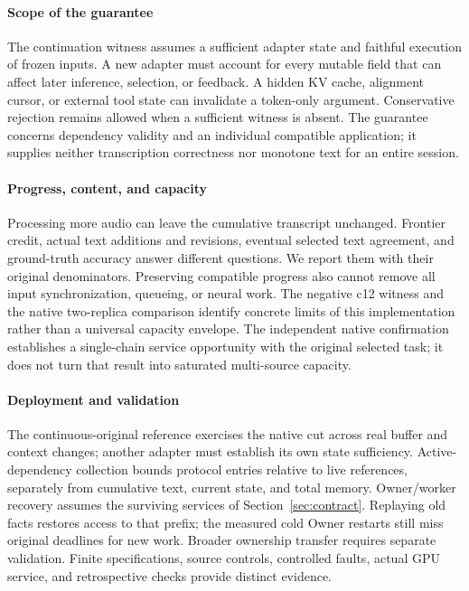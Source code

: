 \paragraph{Scope of the guarantee}
The continuation witness assumes a sufficient adapter state and faithful
execution of frozen inputs. A new adapter must account for every mutable
field that can affect later inference, selection, or feedback. A hidden
KV cache, alignment cursor, or external tool state can invalidate a
token-only argument. Conservative rejection remains allowed when a
sufficient witness is absent. The guarantee concerns dependency validity
and an individual compatible application; it supplies neither transcription
correctness nor monotone text for an entire session.

\paragraph{Progress, content, and capacity}
Processing more audio can leave the cumulative transcript unchanged.
Frontier credit, actual text additions and revisions, eventual selected
text agreement, and ground-truth accuracy answer different questions. We
report them with their original denominators. Preserving compatible
progress also cannot remove all input synchronization, queueing, or neural
work. The negative c12 witness and the native two-replica comparison
identify concrete limits of this implementation rather than a universal
capacity envelope. The independent native confirmation establishes a
single-chain service opportunity with the original selected task; it
does not turn that result into saturated multi-source capacity.

\paragraph{Deployment and validation}
The continuous-original reference exercises the native cut across real
buffer and context changes; another adapter must establish its own state
sufficiency. Active-dependency collection bounds protocol entries relative
to live references, separately from cumulative text, current state, and
total memory. Owner/worker recovery assumes the surviving services of
Section~\ref{sec:contract}. Replaying old facts restores access to that
prefix; the measured cold Owner restarts still miss original deadlines
for new work. Broader ownership transfer requires separate validation.
Finite specifications, source controls, controlled faults, actual GPU
service, and retrospective checks provide distinct evidence.
